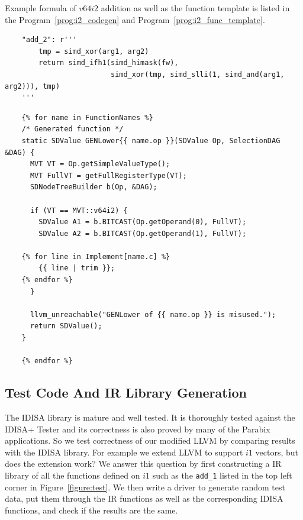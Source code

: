 Example formula of $v64i2$ addition as well as the function template is listed in the Program~\ref{prog:i2_codegen} and Program~\ref{prog:i2_func_template}.

\begin{program}[htbp!]
\begin{verbatim}
    "add_2": r'''
        tmp = simd_xor(arg1, arg2)
        return simd_ifh1(simd_himask(fw),
                         simd_xor(tmp, simd_slli(1, simd_and(arg1, arg2))), tmp)
    '''
\end{verbatim}
\caption[Minimum boolean function for $v64i2$ addition]{Minimum boolean function for $v64i2$ addition.}
\label{prog:i2_codegen}
\end{program}

\begin{program}[htbp!]
\begin{verbatim}
    {% for name in FunctionNames %}
    /* Generated function */
    static SDValue GENLower{{ name.op }}(SDValue Op, SelectionDAG &DAG) {
      MVT VT = Op.getSimpleValueType();
      MVT FullVT = getFullRegisterType(VT);
      SDNodeTreeBuilder b(Op, &DAG);

      if (VT == MVT::v64i2) {
        SDValue A1 = b.BITCAST(Op.getOperand(0), FullVT);
        SDValue A2 = b.BITCAST(Op.getOperand(1), FullVT);

    {% for line in Implement[name.c] %}
        {{ line | trim }};
    {% endfor %}
      }

      llvm_unreachable("GENLower of {{ name.op }} is misused.");
      return SDValue();
    }

    {% endfor %}
\end{verbatim}
\caption[Custom lowering function template for $v64i2$]{Custom lowering function template for $v64i2$. This template file generates one function for each operation.}
\label{prog:i2_func_template}
\end{program}

\subsection{Test Code And IR Library Generation}
The IDISA library is mature and well tested. It is thoroughly tested against the IDISA+ Tester \cite{hua_idisa} and its correctness is also proved by many of the Parabix applications. So we test correctness of our modified LLVM by comparing results with the IDISA library. For example we extend LLVM to support $i1$ vectors, but does the extension work? We answer this question by first constructing a IR library of all the functions defined on $i1$ such as the {\tt add\_1} listed in the top left corner in Figure~\ref{figure:test}. We then write a driver to generate random test data, put them through the IR functions as well as the corresponding IDISA functions, and check if the results are the same.

